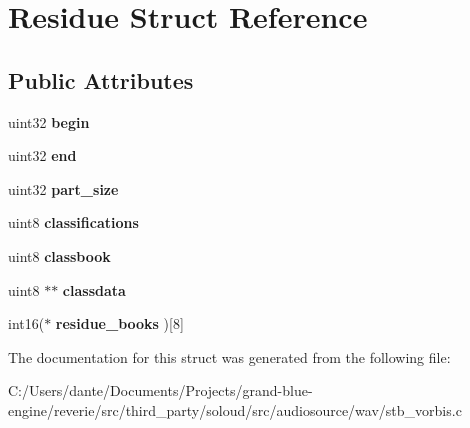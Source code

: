 \hypertarget{struct_residue}{}\section{Residue Struct Reference}
\label{struct_residue}
\subsection*{Public Attributes}
\begin{DoxyCompactItemize}
\item 
\mbox{\label{struct_residue_ad6316cbcc989ab6c2d85147cc7effeca}} 
uint32 {\bfseries begin}
\item 
\mbox{\label{struct_residue_a79e5b0b56d8d18fbf350e8f9d7841f8e}} 
uint32 {\bfseries end}
\item 
\mbox{\label{struct_residue_a88f3f7afce7f7ef97a62c71e5b7fbf3b}} 
uint32 {\bfseries part\+\_\+size}
\item 
\mbox{\label{struct_residue_a7990d602ad1221a4074bd3fb2b6396e4}} 
uint8 {\bfseries classifications}
\item 
\mbox{\label{struct_residue_a2162b2f7f3ac4358a2983f5d372741b1}} 
uint8 {\bfseries classbook}
\item 
\mbox{\label{struct_residue_a079f9b89fb84d8cec7829a640c0f0f85}} 
uint8 $\ast$$\ast$ {\bfseries classdata}
\item 
\mbox{\label{struct_residue_ad8abf85a933f167664f1113b8c0b83a8}} 
int16($\ast$ {\bfseries residue\+\_\+books} )\mbox{[}8\mbox{]}
\end{DoxyCompactItemize}


The documentation for this struct was generated from the following file\+:\begin{DoxyCompactItemize}
\item 
C\+:/\+Users/dante/\+Documents/\+Projects/grand-\/blue-\/engine/reverie/src/third\+\_\+party/soloud/src/audiosource/wav/stb\+\_\+vorbis.\+c\end{DoxyCompactItemize}
